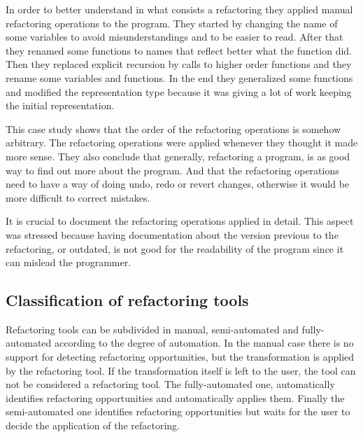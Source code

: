 In order to better understand in what consists a refactoring they applied manual refactoring operations to the program.
They started by changing the name of some variables to avoid misunderstandings and to be easier to read.
After that they renamed some functions to names that reflect better what the function did. 
Then they replaced explicit recursion by calls to higher order functions and they rename some variables and functions.
In the end they generalized some functions and modified the representation type because it was giving a lot of work keeping the initial representation.

This case study shows that the order of the refactoring operations is somehow arbitrary.
The refactoring operations were applied whenever they thought it made more sense.
They also conclude that generally, refactoring a program, is as good way to find out more about the program. 
And that the refactoring operations need to have a way of doing undo, redo or revert changes, otherwise it would be more difficult to correct mistakes.

It is crucial to document the refactoring operations applied in detail. 
This aspect was stressed because having documentation about the version previous to the refactoring, or outdated, is not good for the readability of the program since it can mislead the programmer.


\subsection{Classification of refactoring tools} %
Refactoring tools can be subdivided in manual, semi-automated and fully-automated according to the degree of automation.
In the manual case there is no support for detecting refactoring opportunities, but the transformation is applied by the refactoring tool. If the transformation itself is left to the user, the tool can not be considered a refactoring tool.
The fully-automated one, automatically identifies refactoring opportunities and automatically applies them.
Finally the semi-automated one identifies refactoring opportunities but waits for the user to decide the application of the refactoring.



